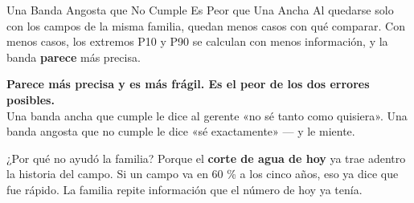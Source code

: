 \documentclass[aspectratio=169, 11pt]{beamer}
\begin{document}
\begin{frame}[shrink=20]{Una Banda Angosta que No Cumple Es Peor que Una Ancha}
  \vspace{3pt}
  {\footnotesize\color{textMuted}
   Al quedarse solo con los campos de la misma familia, quedan menos casos con
   qué comparar. Con menos casos, los extremos P10 y P90 se calculan con menos
   información, y la banda \textbf{parece} más precisa.}
  \vspace{3pt}
  \begin{tcolorbox}[colback=arcaGray, colframe=arcaRed, boxrule=0pt,
    leftrule=4pt, arc=3pt, left=10pt, right=10pt, top=4pt, bottom=4pt]
    {\footnotesize\color{arcaDark}\bfseries
     Parece más precisa y es más frágil. Es el peor de los dos errores
     posibles.}\\[5pt]
    {\footnotesize\color{textMuted}
     Una banda ancha que cumple le dice al gerente «no sé tanto como quisiera».
     Una banda angosta que no cumple le dice «sé exactamente» --- y le miente.}
  \end{tcolorbox}
  \vspace{3pt}
  {\footnotesize\color{textMuted}
   ¿Por qué no ayudó la familia? Porque el \textbf{corte de agua de hoy} ya
   trae adentro la historia del campo. Si un campo va en 60 \% a los cinco
   años, eso ya dice que fue rápido. La familia repite información que el
   número de hoy ya tenía.}
\end{frame}
\end{document}
